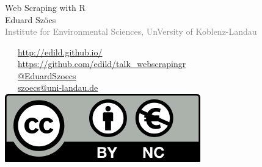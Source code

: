 \documentclass[12pt, t]{beamer}
\begin{document}
\begin{frame}
    \frametitle{}

    \vspace{1em}
    \begin{centering}
    \Large \textcolor{title}{Web Scraping with R} \\[1em]
        Eduard Szöcs \\[0.3em]
    \tiny \textcolor{gray}{Institute for Environmental Sciences, UnVersity of Koblenz-Landau} \\[5em]
    \end{centering}
    \normalsize
    \textcolor{hilight}{\faLaptop}~~~\href{http://edild.github.io/}{http://edild.github.io/ }\\[.5em]
    \textcolor{hilight}{\faGift}~~~\href{https://github.com/edild/talk_webscrapingr}{https://github.com/edild/talk\_webscrapingr}\\[0.5em]
    \textcolor{hilight}{\faTwitter}~~~\href{http://twitter.com/EduardSzoecs}{@EduardSzoecs}     \\[0.5em]
    \textcolor{hilight}{\faEnvelope}~~~\href{mailto:szoecs@uni-landau.de}{szoecs@uni-landau.de} \\[.5em]
    \hfill \includegraphics[width =.3\textwidth]{fig/Cc-by-nc_euro_icon.png} 
\end{frame}
\end{document}
